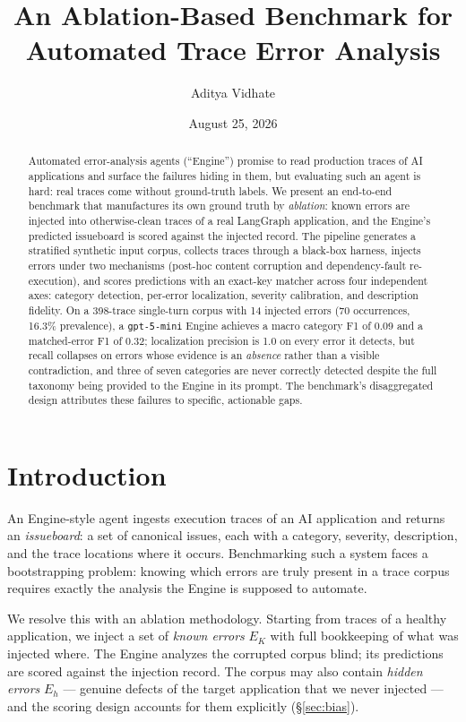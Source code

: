 \documentclass[11pt]{article}
\title{An Ablation-Based Benchmark for Automated Trace Error Analysis}
\author{Aditya Vidhate}
\date{August 25, 2026}
\newcommand{\code}[1]{\texttt{#1}}
\begin{document}
\maketitle

\begin{abstract}
Automated error-analysis agents (``Engine'') promise to read production traces of AI applications and surface the failures hiding in them, but evaluating such an agent is hard: real traces come without ground-truth labels. We present an end-to-end benchmark that manufactures its own ground truth by \emph{ablation}: known errors are injected into otherwise-clean traces of a real LangGraph application, and the Engine's predicted issueboard is scored against the injected record. The pipeline generates a stratified synthetic input corpus, collects traces through a black-box harness, injects errors under two mechanisms (post-hoc content corruption and dependency-fault re-execution), and scores predictions with an exact-key matcher across four independent axes: category detection, per-error localization, severity calibration, and description fidelity. On a 398-trace single-turn corpus with 14 injected errors (70 occurrences, 16.3\% prevalence), a \code{gpt-5-mini} Engine achieves a macro category F1 of 0.09 and a matched-error F1 of 0.32; localization precision is 1.0 on every error it detects, but recall collapses on errors whose evidence is an \emph{absence} rather than a visible contradiction, and three of seven categories are never correctly detected despite the full taxonomy being provided to the Engine in its prompt. The benchmark's disaggregated design attributes these failures to specific, actionable gaps.
\end{abstract}

\section{Introduction}

An Engine-style agent ingests execution traces of an AI application and returns an \emph{issueboard}: a set of canonical issues, each with a category, severity, description, and the trace locations where it occurs. Benchmarking such a system faces a bootstrapping problem: knowing which errors are truly present in a trace corpus requires exactly the analysis the Engine is supposed to automate.

We resolve this with an ablation methodology. Starting from traces of a healthy application, we inject a set of \emph{known errors} $E_K$ with full bookkeeping of what was injected where. The Engine analyzes the corrupted corpus blind; its predictions are scored against the injection record. The corpus may also contain \emph{hidden errors} $E_h$ --- genuine defects of the target application that we never injected --- and the scoring design accounts for them explicitly (\S\ref{sec:bias}).
\end{document}
